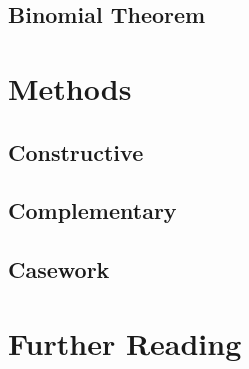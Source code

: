 \documentclass[11pt]{article}
\begin{document}
\subsection{Binomial Theorem}


\section{Methods}

\subsection{Constructive}

\subsection{Complementary}

\subsection{Casework}

\section{Further Reading}
\end{document}
